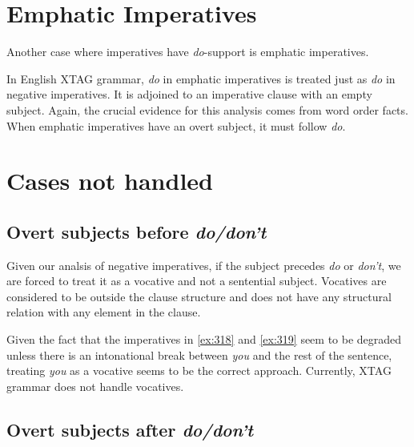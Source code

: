 {{\section{Emphatic Imperatives} 
 
Another case where imperatives have {\it do}-support is emphatic 
imperatives. 
 
\beginsentences
{}\label{ex:314} 
\label{ex:315} 
\endsentences

 
In English XTAG grammar, {\it do} in emphatic imperatives is treated just 
as {\it do} in negative imperatives.  It is adjoined to an imperative 
clause with an empty subject.  Again, the crucial evidence for this 
analysis comes from word order facts.  When emphatic imperatives have an 
overt subject, it must follow {\it do}. 
 
\beginsentences
{}\label{ex:316} 
\label{ex:317} 
\endsentences

 
\section{Cases not handled} 
 
\subsection{Overt subjects before {\it do/don't}} 
\label{sec:vocative} 
 
Given our analsis of negative imperatives, if the subject precedes {\it do} 
or {\it don't}, we are forced to treat it as a vocative and not a 
sentential subject.  Vocatives are considered to be outside the clause 
structure and does not have any structural relation with any element in the 
clause. 
 
\beginsentences
{}\label{ex:318} 
\label{ex:319} 
\endsentences

 
Given the fact that the imperatives in \ref{ex:318} and \ref{ex:319} seem to be 
degraded unless there is an intonational break between {\it you} and the 
rest of the sentence, treating {\it you} as a vocative seems to be the 
correct approach.  Currently, XTAG grammar does not handle vocatives. 
 
\subsection{Overt subjects after {\it do/don't}} 
\label{sec:overt-subject} 
 
}}

